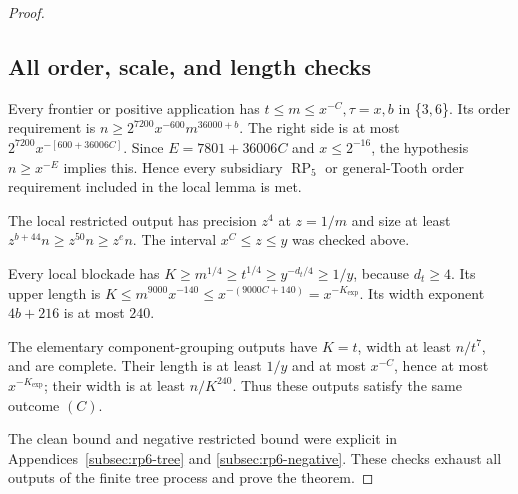 \documentclass[11pt,a4paper]{article}
\theoremstyle{definition}
\theoremstyle{remark}
\numberwithin{equation}{section}
\begin{document}
\begin{proof}
\subsection{All order, scale, and length checks}\label{subsec:rp6-checks}
Every frontier or positive application has \(t\le\allowbreak m\le\allowbreak x^{-C},\allowbreak  \tau=x,\allowbreak  b\) in \{\(3,\allowbreak 6\)\}. Its order requirement is \(n\ge\allowbreak 2^{7200} x^{-600} m^{36000+b}\). The right side is at most \(2^{7200} x^{-[600+36006C]}\). Since \(E=7801+36006C\) and \(x\le\allowbreak 2^{-16}\), the hypothesis \(n\ge\allowbreak x^{-E}\) implies this. Hence every subsidiary \(\operatorname{RP}_{5}\) or general-Tooth order requirement included in the local lemma is met.

The local restricted output has precision \(z^{4}\) at \(z=1/m\) and size at least \(z^{b+44}n\ge\allowbreak z^{50} n\ge\allowbreak z^{e} n\). The interval \(x^{C}\le\allowbreak z\le\allowbreak y\) was checked above.

Every local blockade has \(K\ge\allowbreak m^{1/4}\ge\allowbreak t^{1/4}\ge\allowbreak y^{-d_{t}/4}\ge\allowbreak 1/y\), because \(d_{t}\ge\allowbreak 4\). Its upper length is \(K\le\allowbreak m^{9000} x^{-140}\le\allowbreak x^{-(9000C+140)}=x^{-K_{\exp }}\). Its width exponent \(4b+216\) is at most \(240\).

The elementary component-grouping outputs have \(K=t\), width at least \(n/t^{7}\), and are complete. Their length is at least \(1/y\) and at most \(x^{-C}\), hence at most \(x^{-K_{\exp }}\); their width is at least \(n/K^{240}\). Thus these outputs satisfy the same outcome \((C)\).

The clean bound and negative restricted bound were explicit in Appendices~\ref{subsec:rp6-tree} and \ref{subsec:rp6-negative}. These checks exhaust all outputs of the finite tree process and prove the theorem.
\end{proof}
\end{document}
